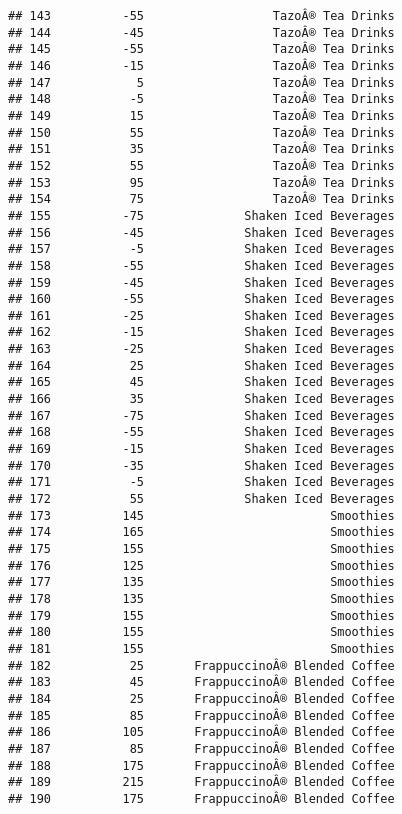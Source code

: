 \documentclass[
]{article}
\begin{document}
\begin{verbatim}
## 143          -55                  TazoÂ® Tea Drinks
## 144          -45                  TazoÂ® Tea Drinks
## 145          -55                  TazoÂ® Tea Drinks
## 146          -15                  TazoÂ® Tea Drinks
## 147            5                  TazoÂ® Tea Drinks
## 148           -5                  TazoÂ® Tea Drinks
## 149           15                  TazoÂ® Tea Drinks
## 150           55                  TazoÂ® Tea Drinks
## 151           35                  TazoÂ® Tea Drinks
## 152           55                  TazoÂ® Tea Drinks
## 153           95                  TazoÂ® Tea Drinks
## 154           75                  TazoÂ® Tea Drinks
## 155          -75              Shaken Iced Beverages
## 156          -45              Shaken Iced Beverages
## 157           -5              Shaken Iced Beverages
## 158          -55              Shaken Iced Beverages
## 159          -45              Shaken Iced Beverages
## 160          -55              Shaken Iced Beverages
## 161          -25              Shaken Iced Beverages
## 162          -15              Shaken Iced Beverages
## 163          -25              Shaken Iced Beverages
## 164           25              Shaken Iced Beverages
## 165           45              Shaken Iced Beverages
## 166           35              Shaken Iced Beverages
## 167          -75              Shaken Iced Beverages
## 168          -55              Shaken Iced Beverages
## 169          -15              Shaken Iced Beverages
## 170          -35              Shaken Iced Beverages
## 171           -5              Shaken Iced Beverages
## 172           55              Shaken Iced Beverages
## 173          145                          Smoothies
## 174          165                          Smoothies
## 175          155                          Smoothies
## 176          125                          Smoothies
## 177          135                          Smoothies
## 178          135                          Smoothies
## 179          155                          Smoothies
## 180          155                          Smoothies
## 181          155                          Smoothies
## 182           25       FrappuccinoÂ® Blended Coffee
## 183           45       FrappuccinoÂ® Blended Coffee
## 184           25       FrappuccinoÂ® Blended Coffee
## 185           85       FrappuccinoÂ® Blended Coffee
## 186          105       FrappuccinoÂ® Blended Coffee
## 187           85       FrappuccinoÂ® Blended Coffee
## 188          175       FrappuccinoÂ® Blended Coffee
## 189          215       FrappuccinoÂ® Blended Coffee
## 190          175       FrappuccinoÂ® Blended Coffee

\end{verbatim}
\end{document}
